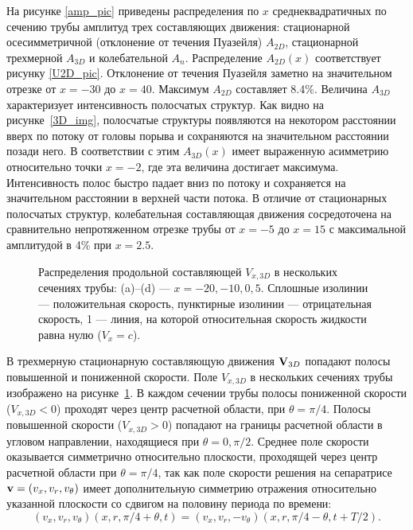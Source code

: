 На рисунке \ref{amp_pic} приведены распределения по $x$ среднеквадратичных по сечению трубы амплитуд трех составляющих движения: стационарной осесимметричной (отклонение от течения Пуазейля) $A_{2D}$, стационарной трехмерной $A_{3D}$ и колебательной $A_n$. Распределение $A_{2D}(x)$ соответствует рисунку \ref{U2D_pic}. Отклонение от течения Пуазейля заметно на значительном отрезке от $x=-30$ до $x=40$. Максимум $A_{2D}$ составляет 8.4\%. Величина $A_{3D}$ характеризует интенсивность полосчатых структур. Как видно на рисунке~\ref{3D_img}, полосчатые структуры появляются на некотором расстоянии вверх по потоку от головы порыва и сохраняются на значительном расстоянии позади него. В соответствии с этим $A_{3D}(x)$ имеет выраженную асимметрию относительно точки $x=-2$, где эта величина достигает максимума. Интенсивность полос быстро падает вниз по потоку и сохраняется на значительном расстоянии в верхней части потока. В отличие от стационарных полосчатых структур, колебательная составляющая движения сосредоточена на сравнительно непротяженном отрезке трубы от $x=-5$ до $x=15$ с максимальной амплитудой в 4\% при $x=2.5$.


\begin{figure}[h]
\caption{Распределения продольной составляющей $V_{x,3D}$ в нескольких сечениях трубы: (a)--(d) --- $x = -20, -10, 0, 5$. Сплошные изолинии --- положительная скорость, пунктирные изолинии --- отрицательная скорость, 1 --- линия, на которой относительная скорость жидкости равна нулю ($V_{x} = c$).}
\label{V3D_cs_pic}
\end{figure}


В трехмерную стационарную составляющую движения $\mathbf{V}_{3D}$ попадают полосы повышенной и пониженной скорости. Поле $V_{x,3D}$ в нескольких сечениях трубы изображено на рисунке~\ref{V3D_cs_pic}. В каждом сечении трубы полосы пониженной скорости ($V_{x,3D} < 0$) проходят через центр расчетной области, при $\theta = \pi/4$. Полосы повышенной скорости ($V_{x,3D} > 0$) попадают на границы расчетной области в угловом направлении, находящиеся при $\theta = 0, \pi/2$. Среднее поле скорости оказывается симметрично относительно плоскости, проходящей через центр расчетной области при $\theta = \pi/4$, так как поле скорости решения на сепаратрисе $\mathbf{v} = (v_x, v_r, v_\theta)$ имеет дополнительную симметрию отражения относительно указанной плоскости со сдвигом на половину периода по времени:
\begin{equation}
(v_x, v_r, v_\theta)(x, r, \pi/4 + \theta, t) = (v_x, v_r, -v_\theta)(x, r, \pi/4 - \theta, t + T/2). 
\end{equation} 


